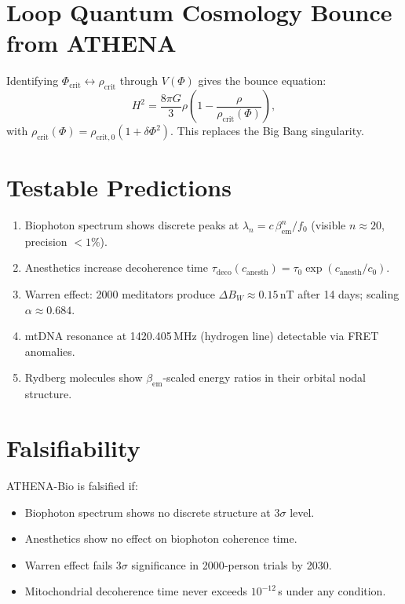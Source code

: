 \documentclass[11pt]{article}
\newcommand{\bem}{\beta_{\mathrm{em}}}
\begin{document}
\section{Loop Quantum Cosmology Bounce from ATHENA}
\label{sec:lqc}
Identifying $\Phi_{\mathrm{crit}}\leftrightarrow\rho_{\mathrm{crit}}$ through $V(\Phi)$ gives the bounce equation:
\begin{equation}
H^2 = \frac{8\pi G}{3} \rho \left(1 - \frac{\rho}{\rho_{\mathrm{crit}}(\Phi)}\right),
\label{eq:lqc}
\end{equation}
with $\rho_{\mathrm{crit}}(\Phi)=\rho_{\mathrm{crit},0}(1+\delta\Phi^2)$. This replaces the Big Bang singularity.

\section{Testable Predictions}
\label{sec:predictions}
\begin{enumerate}
\item Biophoton spectrum shows discrete peaks at $\lambda_n = c\,\bem^{n}/f_0$ (visible $n\approx20$, precision $<1\%$).
\item Anesthetics increase decoherence time $\tau_{\mathrm{deco}}(c_{\mathrm{anesth}}) = \tau_0 \exp(c_{\mathrm{anesth}}/c_0)$.
\item Warren effect: 2000 meditators produce $\Delta B_W\approx0.15$ nT after 14 days; scaling $\alpha\approx0.684$.
\item mtDNA resonance at 1420.405 MHz (hydrogen line) detectable via FRET anomalies.
\item Rydberg molecules show $\bem$-scaled energy ratios in their orbital nodal structure.
\end{enumerate}

\section{Falsifiability}
\label{sec:falsify}
ATHENA-Bio is falsified if:
\begin{itemize}
\item Biophoton spectrum shows no discrete structure at $3\sigma$ level.
\item Anesthetics show no effect on biophoton coherence time.
\item Warren effect fails $3\sigma$ significance in 2000‑person trials by 2030.
\item Mitochondrial decoherence time never exceeds $10^{-12}$ s under any condition.
\end{itemize}
\end{document}
